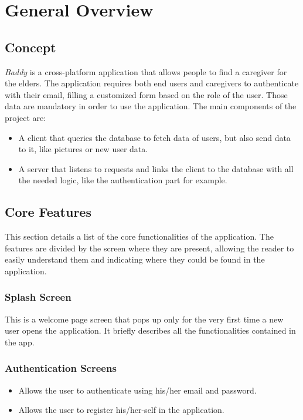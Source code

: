 \documentclass[../../dd.tex]{subfiles}
\begin{document}
    \chapter{General Overview}
    \section{Concept}
    \textit{Baddy} is a cross-platform application that allows people to find a caregiver for the elders.
    The application requires both end users and caregivers to authenticate with their email, filling a customized form
    based on the role of the user.
    Those data are mandatory in order to use the application.
    The main components of the project are:
    \begin{itemize}
        \item A client that queries the database to fetch data of users, but also send data to it,
        like pictures or new user data.
        \item A server that listens to requests and links the client to the database with all the needed logic, like
        the authentication part for example.
    \end{itemize}
    \section{Core Features}
    This section details a list of the core functionalities of the application. The features are divided by the screen where they are present, allowing the reader to easily understand them and indicating where they could be found in the application.
    \subsection{Splash Screen}
    This is a welcome page screen that pops up only for the very first time a new user opens the application.
    It briefly describes all the functionalities contained in the app.

    \subsection{Authentication Screens}
    \begin{itemize}
        \item Allows the user to authenticate using his/her email and password.
        \item Allows the user to register his/her-self in the application.
    \end{itemize}
\end{document}

